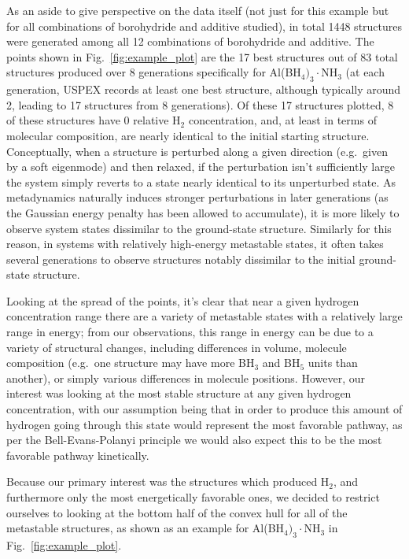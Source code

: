 \documentclass[twocolumn, prb, showpacs]{revtex4-1}
\begin{document}
As an aside to give perspective on the data itself (not just for this example but for all combinations of borohydride and additive studied), in total 1448 structures were generated among all 12 combinations of borohydride and additive. The points shown in Fig.~\ref{fig:example_plot}
are the 17 best structures out of 83 total structures produced over 8 generations specifically for Al(BH$_4)_3\cdot$NH$_3$ (at each generation,
USPEX records at least one best structure, although typically around 2, leading to 17 structures from 8 generations). Of these 17 structures plotted, 8 of these structures
have 0 relative H$_2$ concentration, and, at least in terms of molecular composition, are nearly 
identical to the initial starting structure. Conceptually, when a structure is perturbed along
a given direction (e.g.\ given by a soft eigenmode) and then relaxed, if the perturbation
isn't sufficiently large the system simply reverts to a state nearly identical to its unperturbed
state. As metadynamics naturally induces stronger perturbations in later generations (as the Gaussian
energy penalty has been allowed to accumulate), it is more likely to observe system states dissimilar to the
ground-state structure. Similarly for this reason, in systems with relatively high-energy metastable states,
it often takes several generations to observe structures notably dissimilar to the initial ground-state structure.

Looking at the spread of the points, it's clear that near a given hydrogen
concentration range there are a variety of metastable states with a relatively large
range in energy; from our observations, this range in energy can be due to a
variety of structural changes, including differences in volume, molecule
composition (e.g.\ one structure may have more BH$_3$ and BH$_5$ units than
another), or simply various differences in molecule positions. However, our
interest was looking at the most stable structure at any given hydrogen
concentration, with our assumption being that in order to produce this amount
of hydrogen going through this state would represent the most favorable
pathway, as per the Bell-Evans-Polanyi principle we would also expect this to be the
most favorable pathway kinetically.

Because our primary interest was the structures which produced H$_2$, and
furthermore only the most energetically favorable ones, we decided to restrict
ourselves to looking at the bottom half of the convex hull for all of the
metastable structures, as shown as an example for Al(BH$_4)_3\cdot$NH$_3$ in Fig.~\ref{fig:example_plot}.
\end{document}
